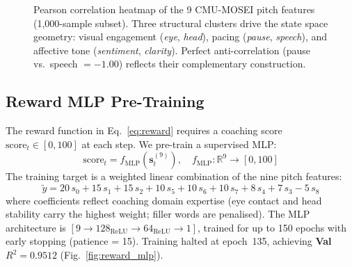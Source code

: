 \documentclass{article}
\begin{document}
\begin{figure}[htbp]
\caption{Pearson correlation heatmap of the 9 CMU-MOSEI pitch features
(1{,}000-sample subset). Three structural clusters drive the state
space geometry: visual engagement (\textit{eye}, \textit{head}),
pacing (\textit{pause}, \textit{speech}), and affective tone
(\textit{sentiment}, \textit{clarity}).
Perfect anti-correlation (pause vs.\ speech $= -1.00$) reflects
their complementary construction.}
\label{fig:mosei_corr}
\end{figure}

\FloatBarrier
\subsection{Reward MLP Pre-Training}

The reward function in Eq.~\eqref{eq:reward} requires a coaching score
$\text{score}_t \in [0, 100]$ at each step. We pre-train a supervised MLP:
\begin{equation}
\text{score}_t = f_{\text{MLP}}\!\left(\mathbf{s}_t^{(9)}\right),
\quad f_{\text{MLP}} : \mathbb{R}^9 \to [0, 100]
\end{equation}
The training target is a weighted linear combination of the nine pitch features:
\begin{equation}
\tilde{y} = 20\,s_0 + 15\,s_1 + 15\,s_2 + 10\,s_5 + 10\,s_6
           + 10\,s_7 + 8\,s_4 + 7\,s_3 - 5\,s_8
\label{eq:score_weights}
\end{equation}
where coefficients reflect coaching domain expertise (eye contact and head
stability carry the highest weight; filler words are penalised).
The MLP architecture is $[9 \!\to\! 128_{\text{ReLU}} \!\to\! 64_{\text{ReLU}} \!\to\! 1]$,
trained for up to 150 epochs with early stopping (patience = 15).
Training halted at epoch~135, achieving \textbf{Val $R^2 = 0.9512$}
(Fig.~\ref{fig:reward_mlp}).
\end{document}
